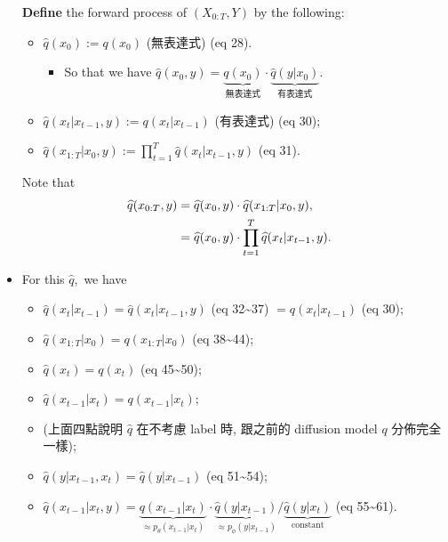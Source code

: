 \documentclass[
]{article}
\providecommand{\tightlist}{%
  \setlength{\itemsep}{0pt}\setlength{\parskip}{0pt}}\usepackage{longtable,booktabs,array}
\theoremstyle{remark}
\begin{document}
\begin{itemize}
  \textbf{Define} the forward process of \((X_{0:T},Y)\) by the
  following:

  \begin{itemize}
  \tightlist
  \item
    \(\widehat{q}(x_0):= q(x_0)\) (無表達式) (eq 28).

    \begin{itemize}
    \tightlist
    \item
      So that we have
      \(\widehat{q}(x_0,y)=\underbrace{q(x_0)}_{\text{無表達式}} \cdot \underbrace{\widehat{q}(y\vert x_0)}_{\text{有表達式}}.\)
    \end{itemize}
  \item
    \(\widehat{q}(x_t\vert x_{t-1},y):= q(x_{t}\vert x_{t-1})\)
    (有表達式) (eq 30);
  \item
    \(\widehat{q}(x_{1:T}\vert x_0,y):= \prod_{t=1}^T \widehat{q}(x_t\vert x_{t-1},y)\)
    (eq 31).
  \end{itemize}

  Note that \[
  \begin{aligned}
    \widehat{q}(x_{0:T},y)
    &= \widehat{q}(x_0,y) \cdot \widehat{q}(x_{1:T}\vert x_0,y), \cr 
    &= \widehat{q}(x_0,y) \cdot \prod_{t=1}^T \widehat{q}(x_t\vert x_{t-1},y).
  \end{aligned}
  \]
\item
  For this \(\widehat{q},\) we have

  \begin{itemize}
  \tightlist
  \item
    \(\widehat{q}(x_{t}\vert x_{t-1})=\widehat{q}(x_{t}\vert x_{t-1},y)\)
    (eq 32\textasciitilde37) \(= q(x_t\vert x_{t-1})\) (eq 30);
  \item
    \(\widehat{q}(x_{1:T}\vert x_0)= q(x_{1:T}\vert x_0)\) (eq
    38\textasciitilde44);
  \item
    \(\widehat{q}(x_t)=q(x_t)\) (eq 45\textasciitilde50);
  \item
    \(\widehat{q}(x_{t-1}\vert x_{t}) = q(x_{t-1}\vert x_{t})\);
  \item
    (上面四點說明 \(\widehat{q}\) 在不考慮 label 時, 跟之前的 diffusion
    model \(q\) 分佈完全一樣);
  \item
    \(\widehat{q}(y\vert x_{t-1},x_{t}) = \widehat{q}(y\vert x_{t-1})\)
    (eq 51\textasciitilde54);
  \item
    \(\widehat{q}(x_{t-1}\vert x_{t},y) = \underbrace{q(x_{t-1}\vert x_{t})}_{\approx p_{\theta}(x_{t-1}\vert x_{t})} \cdot \underbrace{\widehat{q}(y\vert x_{t-1})}_{\approx p_{\phi}(y\vert x_{t-1})} \Big/ \underbrace{\widehat{q}(y\vert x_{t})}_{\text{constant}}\)
    (eq 55\textasciitilde61).


\end{itemize}
\end{itemize}
\end{document}
